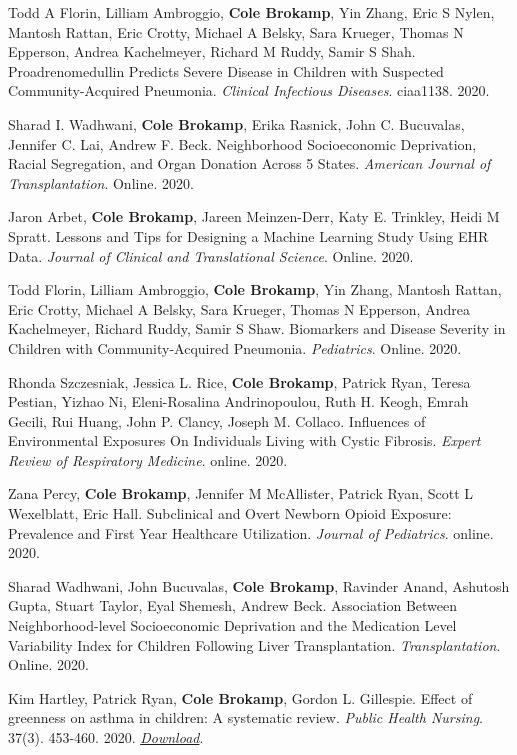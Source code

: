 Todd A Florin, Lilliam Ambroggio, \textbf{Cole Brokamp}, Yin Zhang, Eric
S Nylen, Mantosh Rattan, Eric Crotty, Michael A Belsky, Sara Krueger,
Thomas N Epperson, Andrea Kachelmeyer, Richard M Ruddy, Samir S Shah.
Proadrenomedullin Predicts Severe Disease in Children with Suspected
Community-Acquired Pneumonia. \emph{Clinical Infectious Diseases}.
ciaa1138. 2020.

Sharad I. Wadhwani, \textbf{Cole Brokamp}, Erika Rasnick, John C.
Bucuvalas, Jennifer C. Lai, Andrew F. Beck. Neighborhood Socioeconomic
Deprivation, Racial Segregation, and Organ Donation Across 5 States.
\emph{American Journal of Transplantation}. Online. 2020.

Jaron Arbet, \textbf{Cole Brokamp}, Jareen Meinzen-Derr, Katy E.
Trinkley, Heidi M Spratt. Lessons and Tips for Designing a Machine
Learning Study Using EHR Data. \emph{Journal of Clinical and
Translational Science}. Online. 2020.

Todd Florin, Lilliam Ambroggio, \textbf{Cole Brokamp}, Yin Zhang,
Mantosh Rattan, Eric Crotty, Michael A Belsky, Sara Krueger, Thomas N
Epperson, Andrea Kachelmeyer, Richard Ruddy, Samir S Shaw. Biomarkers
and Disease Severity in Children with Community-Acquired Pneumonia.
\emph{Pediatrics}. Online. 2020.

Rhonda Szczesniak, Jessica L. Rice, \textbf{Cole Brokamp}, Patrick Ryan,
Teresa Pestian, Yizhao Ni, Eleni-Rosalina Andrinopoulou, Ruth H. Keogh,
Emrah Gecili, Rui Huang, John P. Clancy, Joseph M. Collaco. Influences
of Environmental Exposures On Individuals Living with Cystic Fibrosis.
\emph{Expert Review of Respiratory Medicine}. online. 2020.

Zana Percy, \textbf{Cole Brokamp}, Jennifer M McAllister, Patrick Ryan,
Scott L Wexelblatt, Eric Hall. Subclinical and Overt Newborn Opioid
Exposure: Prevalence and First Year Healthcare Utilization.
\emph{Journal of Pediatrics}. online. 2020.

Sharad Wadhwani, John Bucuvalas, \textbf{Cole Brokamp}, Ravinder Anand,
Ashutosh Gupta, Stuart Taylor, Eyal Shemesh, Andrew Beck. Association
Between Neighborhood-level Socioeconomic Deprivation and the Medication
Level Variability Index for Children Following Liver Transplantation.
\emph{Transplantation}. Online. 2020.

Kim Hartley, Patrick Ryan, \textbf{Cole Brokamp}, Gordon L. Gillespie.
Effect of greenness on asthma in children: A systematic review.
\emph{Public Health Nursing}. 37(3). 453-460. 2020.
\href{https://colebrokamp-website.s3.us-east-1.amazonaws.com/publications/Hartley_PHN_2020.pdf}{\emph{Download}}.

